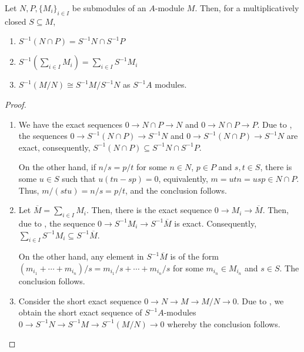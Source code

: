\begin{proposition}
    Let $N,P,\{M_i\}_{i\in I}$ be submodules of an $A$-module $M$. Then, for a multiplicatively closed $S\subseteq M$,
    \begin{enumerate}[label=(\alph*)]
        \item $S^{-1}(N\cap P) = S^{-1}N\cap S^{-1}P$
        \item $\displaystyle S^{-1}\left(\sum_{i\in I}M_i\right) = \sum_{i\in I}S^{-1}M_i$
        \item $S^{-1}(M/N)\cong S^{-1}M/S^{-1}N$ as $S^{-1}A$ modules.
    \end{enumerate}
\end{proposition}
\begin{proof}
\begin{enumerate}[label=(\alph*)]
\item We have the exact sequences $0\rightarrow N\cap P\rightarrow N$ and $0\rightarrow N\cap P\rightarrow P$. Due to , the sequences $0\rightarrow S^{-1}(N\cap P)\rightarrow S^{-1}N$ and $0\rightarrow S^{-1}(N\cap P)\rightarrow S^{-1}N$ are exact, consequently, $S^{-1}(N\cap P)\subseteq S^{-1}N\cap S^{-1}P$.

On the other hand, if $n/s = p/t$ for some $n\in N$, $p\in P$ and $s,t\in S$, there is some $u\in S$ such that $u(tn - sp) = 0$, equivalently, $m = utn = usp\in N\cap P$. Thus, $m/(stu) = n/s = p/t$, and the conclusion follows.

\item Let $\overline M = \sum_{i\in I}M_i$. Then, there is the exact sequence $0\rightarrow M_i\rightarrow \overline M$. Then, due to , the sequence $0\rightarrow S^{-1}M_i\rightarrow S^{-1}\overline M$ is exact. Consequently, $\displaystyle\sum_{i\in I}S^{-1}M_i\subseteq S^{-1}\overline M$.

On the other hand, any element in $S^{-1}\overline M$ is of the form $(m_{i_1} + \cdots + m_{i_n})/s = m_{i_1}/s + \cdots + m_{i_n}/s$ for some $m_{i_n}\in M_{i_n}$ and $s\in S$. The conclusion follows.

\item Consider the short exact sequence $0\rightarrow N\rightarrow M\rightarrow M/N\rightarrow 0$. Due to , we obtain the short exact sequence of $S^{-1}A$-modules $0\rightarrow S^{-1}N\rightarrow S^{-1}M\rightarrow S^{-1}(M/N)\rightarrow 0$ whereby the conclusion follows.
\end{enumerate}
\end{proof}

